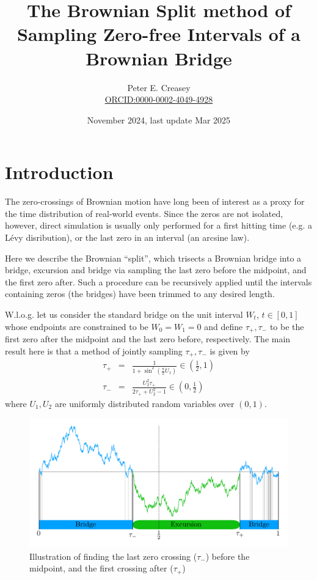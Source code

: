 \documentclass{article}
\title{The Brownian Split method of Sampling Zero-free Intervals of a Brownian Bridge}
\author{Peter E. Creasey \\
  \href{https://orcid.org/0000-0002-4049-4928}{ORCID:0000-0002-4049-4928}}
\date{November 2024, last update Mar 2025}
\newcommand{\tm}{{\tau_{\mathrm{-}}}}
\newcommand{\tp}{{\tau_{\mathrm{+}}}}
\begin{document}
\maketitle

\section{Introduction}

The zero-crossings of Brownian motion have long been of interest as a proxy for the time distribution of real-world events. Since the zeros are not isolated, however, direct simulation is usually only performed for a first hitting time (e.g. a L\'evy disribution), or the last zero in an interval (an arcsine law).

Here we describe the Brownian ``split'', which trisects a Brownian bridge into a bridge, excursion and bridge via sampling the last zero before the midpoint, and the first zero after. Such a procedure can be recursively applied until the intervals containing zeros (the bridges) have been trimmed to any desired length.

W.l.o.g. let us consider the standard bridge on the unit interval $W_t$, $t\in [0,1]$ whose endpoints are constrained to be $W_0=W_1=0$ and define $\tp,\tm$ to be the first zero after the midpoint and the last zero before, respectively. The main result here is that a method of jointly sampling $\tp,\tm$ is given by
\begin{eqnarray}
\tp &=& \frac{1}{1+\sin^2 \left( \frac{\pi}{2} U_1 \right)} \in \left(\frac{1}{2},1\right) \label{eq:stp} \\
\tm &=& \frac{U_2^2 \tp}{2\tp + U_2^2 -1} \in \left(0,\frac{1}{2}\right)  \label{eq:stm}
\end{eqnarray}
where $U_1,U_2$ are uniformly distributed random variables over $(0,1)$.
\begin{figure}[H]
\centering
\includegraphics[width=\columnwidth]{figs/illustration.png}
\caption{Illustration of finding the last zero crossing ($\tm$) before the midpoint, and the first crossing after ($\tp$)}
\end{figure}
\end{document}
